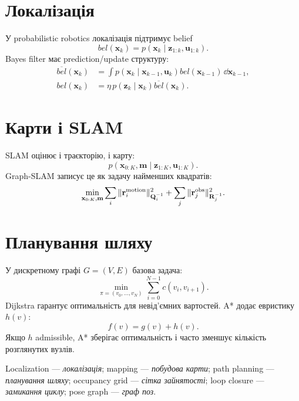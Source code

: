 \section{Локалізація}

У probabilistic robotics локалізація підтримує belief
\begin{equation}
 bel(\mathbf{x}_k)=p(\mathbf{x}_k\mid \mathbf{z}_{1:k},\mathbf{u}_{1:k}).
\end{equation}
Bayes filter має prediction/update структуру:
\begin{align}
 \overline{bel}(\mathbf{x}_k)&=\int p(\mathbf{x}_k\mid\mathbf{x}_{k-1},\mathbf{u}_k)bel(\mathbf{x}_{k-1})\,\dd\mathbf{x}_{k-1},\\
 bel(\mathbf{x}_k)&=\eta\,p(\mathbf{z}_k\mid\mathbf{x}_k)\overline{bel}(\mathbf{x}_k).
\end{align}

\section{Карти і SLAM}

SLAM оцінює і траєкторію, і карту:
\begin{equation}
 p(\mathbf{x}_{0:K},\mathbf{m}\mid \mathbf{z}_{1:K},\mathbf{u}_{1:K}).
\end{equation}
Graph-SLAM записує це як задачу найменших квадратів:
\begin{equation}
 \min_{\mathbf{x}_{0:K},\mathbf{m}}\sum_i \|\mathbf{r}^{\rm motion}_i\|^2_{\mathbf{Q}_i^{-1}}+
 \sum_j \|\mathbf{r}^{\rm obs}_j\|^2_{\mathbf{R}_j^{-1}}.
\end{equation}

\section{Планування шляху}

У дискретному графі $G=(V,E)$ базова задача:
\begin{equation}
 \min_{\pi=(v_0,\ldots,v_N)}\sum_{i=0}^{N-1} c(v_i,v_{i+1}).
\end{equation}
Dijkstra гарантує оптимальність для невід'ємних вартостей. A* додає евристику $h(v)$:
\begin{equation}
 f(v)=g(v)+h(v).
\end{equation}
Якщо $h$ admissible, A* зберігає оптимальність і часто зменшує кількість розглянутих вузлів.

Localization --- \emph{локалізація}; mapping --- \emph{побудова карти}; path planning --- \emph{планування шляху}; occupancy grid --- \emph{сітка зайнятості}; loop closure --- \emph{замикання циклу}; pose graph --- \emph{граф поз}.
